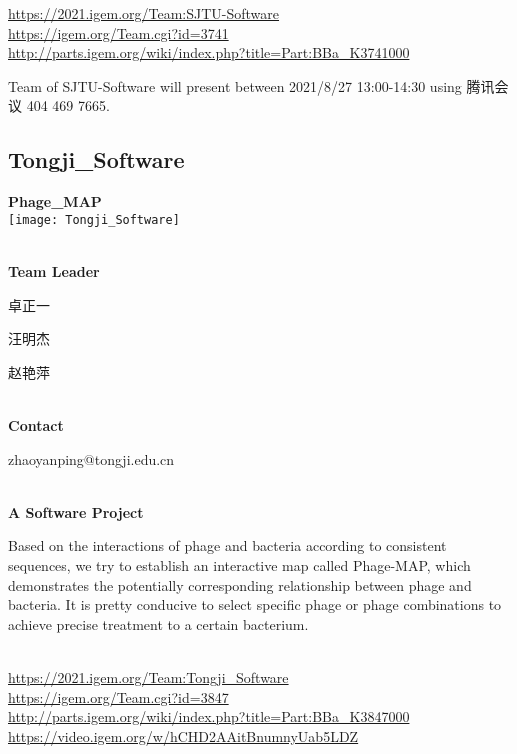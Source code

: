 \url{https://2021.igem.org/Team:SJTU-Software }\\
\url{https://igem.org/Team.cgi?id=3741 }\\
\url{http://parts.igem.org/wiki/index.php?title=Part:BBa_K3741000 }\\


\vfill{}









Team of SJTU-Software will present between 2021/8/27 13:00-14:30        using 腾讯会议 404 469 7665.
\newpage


\subsection{\textcolor{Blu}{ Tongji\_Software } }
\vspace{5mm}
\begin{center}
\large{
  \textbf{ Phage\_MAP }\\

  \texttt{[image: Tongji\_Software]}
}
\end{center}
\textbf{\\Team Leader}

  卓正一

  汪明杰

  赵艳萍


\textbf{\\Contact}

  zhaoyanping@tongji.edu.cn


\textbf{\\A Software Project\\}\begin{spacing}{1.5}

Based on the interactions of phage and bacteria according to consistent sequences, we try to establish an interactive map called Phage-MAP, which demonstrates the potentially corresponding relationship between phage and bacteria. It is pretty conducive to select specific phage or phage combinations to achieve precise treatment to a certain bacterium.\end{spacing}
\\

\url{https://2021.igem.org/Team:Tongji\_Software }\\
\url{https://igem.org/Team.cgi?id=3847 }\\
\url{http://parts.igem.org/wiki/index.php?title=Part:BBa_K3847000 }\\
\url{https://video.igem.org/w/hCHD2AAitBnumnyUab5LDZ }\\

